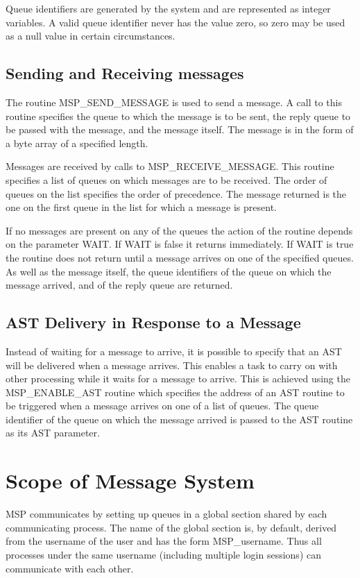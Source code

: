 Queue identifiers are generated by the system and are represented as
integer variables. A valid queue identifier never has the value zero,
so zero may be used as a null value in certain circumstances.

\subsection{Sending and Receiving messages}

The routine MSP\_SEND\_MESSAGE is used to send a message. A call to
this routine specifies the queue to which the message is to be sent, the
reply queue to be passed with the message, and the message itself. The
message is in the form of a byte array of a specified length.

Messages are received by calls to MSP\_RECEIVE\_MESSAGE. This routine
specifies a list of queues on which messages are to be received. The order of
queues on the list specifies the order of precedence. The message returned is
the one on the first queue in the list for which a message is present.

If no messages are present on any of the queues the action of the routine
depends on the parameter WAIT. If WAIT is false it returns immediately. If
WAIT is true the routine does not return until a message arrives on
one of the specified queues. As well as the message itself, the queue identifiers
of the queue on which the message arrived, and of the reply queue are returned.

\subsection{AST Delivery in Response to a Message}

Instead of waiting for a message to arrive, it is possible to specify that
an AST will be delivered when a message arrives. This enables a task to carry
on with other processing while it waits for a message to arrive. This is
achieved using the MSP\_ENABLE\_AST routine which specifies the address of an
AST routine to be triggered when a message arrives on one of a list of queues.
The queue identifier of the queue on which the message arrived is passed to
the AST routine as its AST parameter.

\section{Scope of Message System}

MSP communicates by setting up queues in a global section shared by each
communicating process. The name of the global section is, by default, derived
from the username of the user and has the form MSP\_username. Thus all
processes under the same username (including multiple login sessions) can
communicate with each other.

